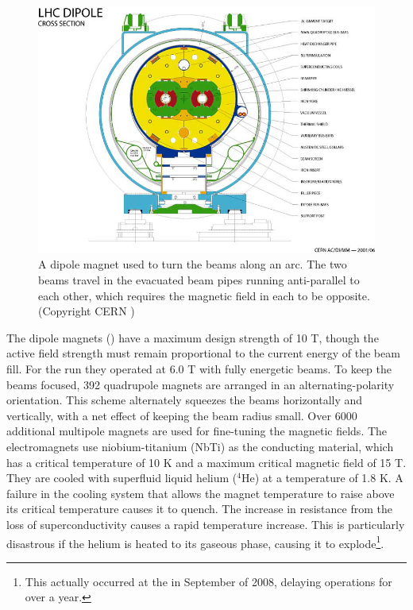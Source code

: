 \begin{figure}[t]
\includegraphics{LHC-PHO-2001-187.jpg}
\caption{A dipole magnet used to turn the beams along an arc. The two beams travel in the evacuated beam pipes running anti-parallel to each other, which requires the magnetic field in each to be opposite. (Copyright CERN \cite{Valeriane:843195})}
\label{fig:dipole_cross_section}
\end{figure}

The dipole magnets () have a maximum design strength of 10 T, though the active field strength must remain proportional to the current energy of the beam fill.
For the \pPbenergy \pPb run they operated at 6.0 T with fully energetic beams.
To keep the beams focused, 392 quadrupole magnets are arranged in an alternating-polarity orientation.
This scheme alternately squeezes the beams horizontally and vertically, with a net effect of keeping the beam radius small.
Over 6000 additional multipole magnets are used for fine-tuning the magnetic fields.
The electromagnets use niobium-titanium (NbTi) as the conducting material, which has a critical temperature of 10 K and a maximum critical magnetic field of 15 T.
They are cooled with superfluid liquid helium (${}^{4}\textrm{He}$) at a temperature of 1.8 K.
A failure in the cooling system that allows the magnet temperature to raise above its critical temperature causes it to quench.
The increase in resistance from the loss of superconductivity causes a rapid temperature increase.
This is particularly disastrous if the helium is heated to its gaseous phase, causing it to explode\footnote{This actually occurred at the \lhc in September of 2008, delaying operations for over a year.}.


